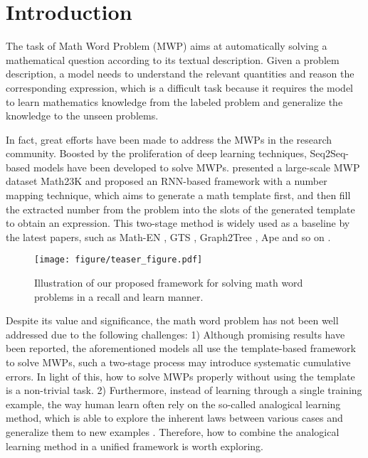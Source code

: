 \documentclass[11pt, a4paper]{article}
\begin{document}
\section{Introduction}
The task of Math Word Problem (MWP) aims at automatically solving a mathematical question according to its textual description. Given a problem description, a model needs to understand the relevant quantities and reason the corresponding expression, which is a difficult task because it requires the model to learn mathematics knowledge from the labeled problem and generalize the knowledge to the unseen problems.

In fact, great efforts have been made to address the MWPs in the research community. Boosted by the proliferation of deep learning techniques, Seq2Seq-based models have been developed to solve MWPs. \citet{wang2017deep} presented a large-scale MWP dataset Math23K and proposed an RNN-based framework with a number mapping technique, which aims to generate a math template first, and then fill the extracted number from the problem into the slots of the generated template to obtain an expression. This two-stage method is widely used as a baseline by the latest papers, such as Math-EN \citep{wang2018translating}, GTS \citep{xie2019goal}, Graph2Tree \citep{zhang2020graph}, Ape \citep{zhao2020ape210k} and so on \citep{wang2019template, li2019modeling}.


\begin{figure}[t]
	\centering
	\texttt{[image: figure/teaser\_figure.pdf]}
	\vspace{-0.4cm}
	\caption{Illustration of our proposed framework for solving math word problems in a recall and learn manner.}
	\label{fig: MWP}
\end{figure}

Despite its value and significance, the math word problem has not been well addressed due to the following challenges: 1) Although promising results have been reported, the aforementioned models all use the template-based framework to solve MWPs, such a two-stage process may introduce systematic cumulative errors. In light of this, how to solve MWPs properly without using the template is a non-trivial task. 2) Furthermore, instead of learning through a single training example, the way human learn often rely on the so-called analogical learning method, which is able to explore the inherent laws between various cases and generalize them to new examples \cite{schwartz2016abcs, hope2017accelerating}. Therefore, how to combine the analogical learning method in a unified framework is worth exploring.
\end{document}
